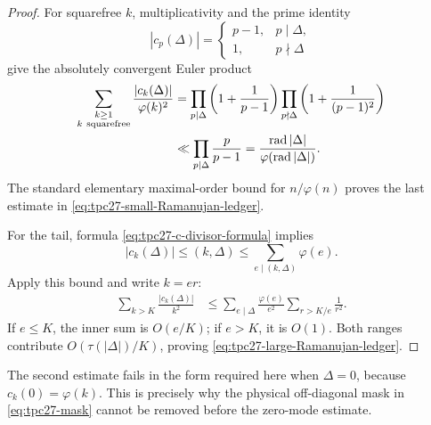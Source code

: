 \begin{proof}
For squarefree \(k\), multiplicativity and the prime identity
\[
 |c_p(\Delta)|=
 \begin{cases}
 p-1,&p\mid\Delta,\\
 1,&p\nmid\Delta
 \end{cases}
\]
give the absolutely convergent Euler product
\begin{align*}
 \sum_{\substack{k\ge1\\k\ \mathrm{squarefree}}}
 \frac{|c_k(\Delta)|}{\varphi(k)^2}
 &=
 \prod_{p\mid\Delta}\left(1+\frac1{p-1}\right)
 \prod_{p\nmid\Delta}\left(1+\frac1{(p-1)^2}\right)\\
 &\ll \prod_{p\mid\Delta}\frac p{p-1}
 =\frac{\operatorname{rad}|\Delta|}{\varphi(\operatorname{rad}|\Delta|)}.
\end{align*}
The standard elementary maximal-order bound for \(n/\varphi(n)\)
proves the last estimate in
\eqref{eq:tpc27-small-Ramanujan-ledger}.

For the tail, formula \eqref{eq:tpc27-c-divisor-formula} implies
\begin{equation}
 |c_k(\Delta)|\le(k,\Delta)
 \le\sum_{e\mid(k,\Delta)}\varphi(e).
 \label{eq:tpc27-c-gcd-bound}
\end{equation}
Apply this bound and write \(k=er\):
\begin{align*}
 \sum_{k>K}\frac{|c_k(\Delta)|}{k^2}
 &\le
 \sum_{e\mid\Delta}\frac{\varphi(e)}{e^2}
 \sum_{r>K/e}\frac1{r^2}.
\end{align*}
If \(e\le K\), the inner sum is \(O(e/K)\); if \(e>K\), it is
\(O(1)\).  Both ranges contribute
\(O(\tau(|\Delta|)/K)\), proving
\eqref{eq:tpc27-large-Ramanujan-ledger}.
\end{proof}

The second estimate fails in the form required here when
\(\Delta=0\), because \(c_k(0)=\varphi(k)\).  This is precisely why
the physical off-diagonal mask in \eqref{eq:tpc27-mask} cannot be
removed before the zero-mode estimate.
